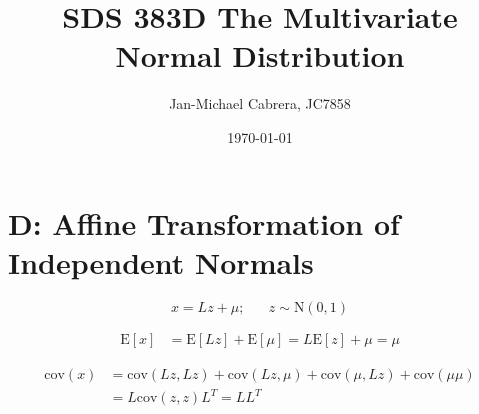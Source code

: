 \documentclass[12pt]{article}
\newcommand{\cov}{\text{cov}}
\newcommand{\E}{\text{E}}
\begin{document}
    \title{SDS 383D The Multivariate Normal Distribution}
    \author{Jan-Michael Cabrera, JC7858}
    \date{\today}
    \maketitle

    \section*{D: Affine Transformation of Independent Normals}

        \begin{equation}
            x = L z + \mu; \hspace{20pt} z \sim \text{N}(0,1)
        \end{equation}

        \begin{align}
            \E [x] &= \E[Lz] + \E[\mu] = L \E[z] + \mu = \mu
        \end{align}

        \begin{align}
            \cov(x) &= \cov(Lz, Lz) + \cov(Lz, \mu) + \cov(\mu, Lz) + \cov(\mu \mu) \\
            & = L \cov(z, z) L^T = L L^T
        \end{align}
\end{document}
